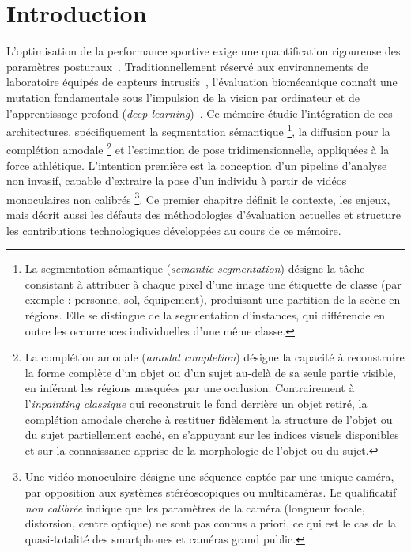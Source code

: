 \chapter{Introduction} \label{ch_one}

L'optimisation de la performance sportive exige une quantification rigoureuse des paramètres posturaux~\cite{Colyer-2018}. Traditionnellement réservé aux environnements de laboratoire équipés de capteurs intrusifs~\cite{Colyer-2018}, l'évaluation biomécanique connaît une mutation fondamentale sous l'impulsion de la vision par ordinateur et de l'apprentissage profond (\textit{deep learning})~\cite{Human-Pose-Estimation-2021}. Ce mémoire étudie l'intégration de ces architectures, spécifiquement la segmentation sémantique \footnote{La segmentation sémantique (\textit{semantic segmentation}) désigne la tâche consistant à attribuer à chaque pixel d'une image une étiquette de classe (par exemple : personne, sol, équipement), produisant une partition de la scène en régions. Elle se distingue de la segmentation d'instances, qui différencie en outre les occurrences individuelles d'une même classe.}, la diffusion pour la complétion amodale \footnote{La complétion amodale (\textit{amodal completion}) désigne la capacité à reconstruire la forme complète d'un objet ou d'un sujet au-delà de sa seule partie visible, en inférant les régions masquées par une occlusion. Contrairement à l'\textit{inpainting classique} qui reconstruit le fond derrière un objet retiré, la complétion amodale cherche à restituer fidèlement la structure de l'objet ou du sujet partiellement caché, en s'appuyant sur les indices visuels disponibles et sur la connaissance apprise de la morphologie de l'objet ou du sujet.} et l'estimation de pose tridimensionnelle, appliquées à la force athlétique. L'intention première est la conception d'un pipeline d'analyse non invasif, capable d'extraire la pose d'un individu à partir de vidéos monoculaires non calibrés \footnote{Une vidéo monoculaire désigne une séquence captée par une unique caméra, par opposition aux systèmes stéréoscopiques ou multicaméras. Le qualificatif \emph{non calibrée} indique que les paramètres de la caméra (longueur focale, distorsion, centre optique) ne sont pas connus a priori, ce qui est le cas de la quasi-totalité des smartphones et caméras grand public.}. Ce premier chapitre définit le contexte, les enjeux, mais décrit aussi les défauts des méthodologies d'évaluation actuelles et structure les contributions technologiques développées au cours de ce mémoire.


